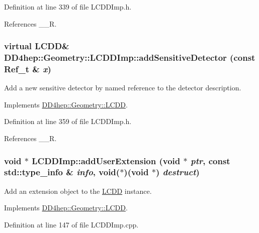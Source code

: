 Definition at line 339 of file LCDDImp.h.

References \_\-\_\-R.\hypertarget{class_d_d4hep_1_1_geometry_1_1_l_c_d_d_imp_a5509dc3840aa73a8c5d5e8f886f3be3f}{
\subsubsection[{addSensitiveDetector}]{\setlength{\rightskip}{0pt plus 5cm}virtual {\bf LCDD}\& DD4hep::Geometry::LCDDImp::addSensitiveDetector (const {\bf Ref\_\-t} \& {\em x})}}
\label{class_d_d4hep_1_1_geometry_1_1_l_c_d_d_imp_a5509dc3840aa73a8c5d5e8f886f3be3f}


Add a new sensitive detector by named reference to the detector description. 

Implements \hyperlink{class_d_d4hep_1_1_geometry_1_1_l_c_d_d_aa574186ef096f626835ea6f389769230}{DD4hep::Geometry::LCDD}.

Definition at line 359 of file LCDDImp.h.

References \_\-\_\-R.\hypertarget{class_d_d4hep_1_1_geometry_1_1_l_c_d_d_imp_a6a8e772cd986a1e6211b4e3b0b1ae997}{
\subsubsection[{addUserExtension}]{\setlength{\rightskip}{0pt plus 5cm}void $\ast$ LCDDImp::addUserExtension (void $\ast$ {\em ptr}, \/  const std::type\_\-info \& {\em info}, \/  void($\ast$)(void $\ast$) {\em destruct})}}
\label{class_d_d4hep_1_1_geometry_1_1_l_c_d_d_imp_a6a8e772cd986a1e6211b4e3b0b1ae997}


Add an extension object to the \hyperlink{class_d_d4hep_1_1_geometry_1_1_l_c_d_d}{LCDD} instance. 

Implements \hyperlink{class_d_d4hep_1_1_geometry_1_1_l_c_d_d_ae4fdea118902519ae7581fe0bd733559}{DD4hep::Geometry::LCDD}.

Definition at line 147 of file LCDDImp.cpp.

